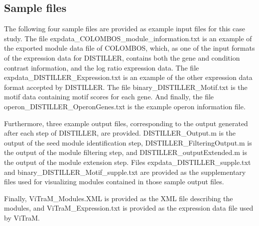 %
%
%
%






\subsection{Sample files}\label{sec:dist-sample}

The following four sample files are provided as example input files for this 
case study. The file expdata\_COLOMBOS\_module\_information.txt is an example 
of the exported module data file of COLOMBOS, which, as one of the input 
formats of the expression data for DISTILLER, contains both the gene and 
condition contrast information, and the log ratio expression data. The file 
expdata\_DISTILLER\_Expression.txt is an example of the other expression data
format accepted by DISTILLER. The file binary\_DISTILLER\_Motif.txt is the motif
data containing motif scores for each gene. And finally, the file 
operon\_DISTILLER\_OperonGenes.txt is the example operon information file.

Furthermore, three example output files, corresponding to the output generated
after each step of DISTILLER, are provided. DISTILLER\_Output.m is the output of
the seed module identification step, DISTILLER\_FilteringOutput.m is the output
of the module filtering step, and DISTILLER\_outputExtended.m is the output of
the module extension step. Files expdata\_DISTILLER\_supple.txt and
binary\_DISTILLER\_Motif\_supple.txt are provided as the supplementary files 
used for visualizing modules contained in those sample output files.

Finally, ViTraM\_Modules.XML is provided as the XML file describing the modules,
and ViTraM\_Expression.txt is provided as the expression data file used by
ViTraM.

